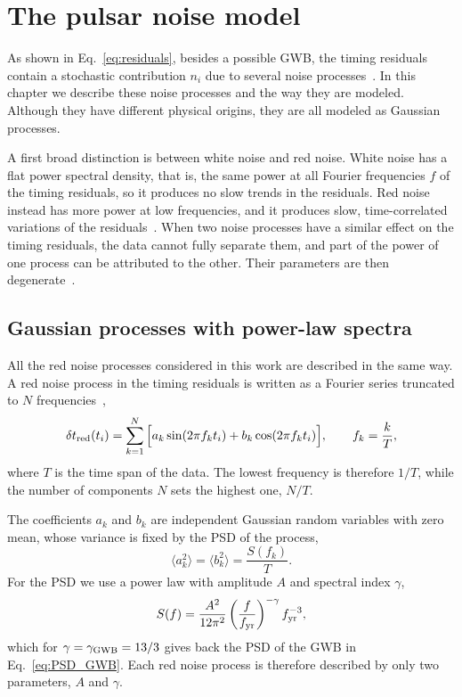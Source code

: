 \chapter{The pulsar noise model} \label{chpt:rumore}

As shown in Eq.~\eqref{eq:residuals}, besides a possible GWB, the timing
residuals contain a stochastic contribution $n_i$ due to several noise
processes~\cite{Lentati2016,Shaifullah2025}.
In this chapter we describe these noise processes and the way they are modeled.
Although they have different physical origins, they are all modeled as
Gaussian processes.

A first broad distinction is between white noise and red noise. White noise
has a flat power spectral density, that is, the same power at all Fourier
frequencies $f$ of the timing residuals, so it produces no slow trends in the
residuals. Red noise instead has more power at low
frequencies, and it produces slow, time-correlated variations of the
residuals~\cite{Taylor2021}. When two noise processes have a
similar effect on the timing residuals, the data cannot fully separate them,
and part of the power of one process can be attributed to the other. Their
parameters are then degenerate~\cite{Shaifullah2025,Ferranti2025}.

\section{Gaussian processes with power-law spectra} \label{sec:modello_comune}

All the red noise processes considered in this work are described in the same
way. A red noise process in the timing residuals is written as a Fourier series
truncated to $N$ frequencies~\cite{Taylor2021},
\begin{equation}
    \delta t_{\rm red}(t_i) = \sum_{k=1}^{N} \Big[ a_k \sin(2\pi f_k t_i)
    + b_k \cos(2\pi f_k t_i) \Big],
    \qquad f_k = \frac{k}{T},
    \label{eq:fourier}
\end{equation}
where $T$ is the time span of the data. The lowest frequency is therefore
$1/T$, while the number of components $N$ sets the highest one, $N/T$.

The coefficients $a_k$ and $b_k$ are independent Gaussian random variables
with zero mean, whose variance is fixed by the PSD of the process,
\begin{equation}
    \langle a_k^2 \rangle = \langle b_k^2 \rangle = \frac{S(f_k)}{T}.
    \label{eq:varianza_coeff}
\end{equation}
For the PSD we use a power law with amplitude $A$ and spectral index $\gamma$,
\begin{equation}
    S(f) = \frac{A^2}{12\pi^2}\left(\frac{f}{f_{\mathrm{yr}}}\right)^{-\gamma}f_{\mathrm{yr}}^{-3},
    \label{eq:PSD_powerlaw}
\end{equation}
which for $\gamma = \gamma_{\mathrm{GWB}} = 13/3$ gives back the PSD of the GWB in
Eq.~\eqref{eq:PSD_GWB}. Each red noise process is therefore described by only
two parameters, $A$ and $\gamma$.

